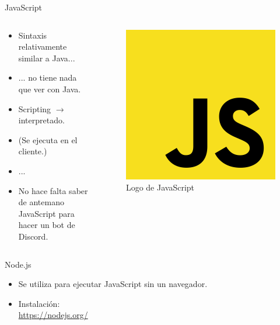 \documentclass[10pt]{beamer} %
\begin{document}
\begin{frame}{JavaScript}
\begin{columns}[]
\begin{column}{.5\linewidth}
    \begin{itemize}
        \item Sintaxis relativamente similar a Java...
        \item ... no tiene nada que ver con Java.
        \item Scripting $\rightarrow$ interpretado.
        \item (Se ejecuta en el cliente.)
        \item ...
        \item No hace falta saber de antemano JavaScript para hacer un bot de Discord.
    \end{itemize}
\end{column}
\begin{column}{.5\linewidth}
    \begin{figure}
        \centering
        \includegraphics[width=.6\linewidth]{javascript.png}
        \caption{Logo de JavaScript}
        \label{fig:jsl}
    \end{figure}
\end{column}

\end{columns}
\end{frame}

\begin{frame}{Node.js}
    \begin{itemize}
        \item Se utiliza para ejecutar JavaScript sin un navegador.
        \item Instalación: \\ \url{https://nodejs.org/}
    \end{itemize}
\end{frame}
    
\end{document}
